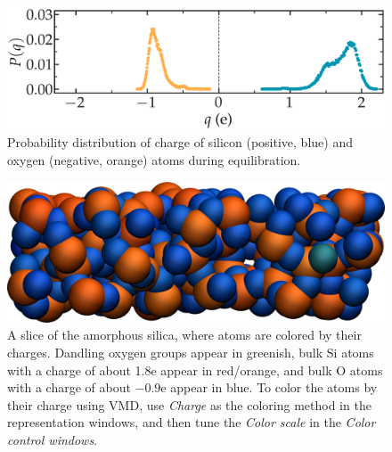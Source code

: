 \documentclass[9pt,tutorial]{livecoms}
\begin{document}
\begin{figure}
\includegraphics[width=\linewidth]{SIO-distribution}
\caption{Probability distribution of charge of silicon (positive, blue) and oxygen (negative, orange) atoms during equilibration.}
\label{fig:SIO-distribution}
\end{figure}

\begin{figure}
\includegraphics[width=\linewidth]{SIO-slice}
\caption{A slice of the amorphous silica, where atoms are colored by their charges. Dandling oxygen groups appear in greenish, bulk Si atoms with a charge of about 1.8e appear in red/orange, and bulk O atoms with a charge of about $-0.9\text{e}$ appear in blue. To color the atoms by their charge using VMD, use \textit{Charge} as the coloring method in the representation windows, and then tune the \textit{Color scale} in the \textit{Color control windows}.}
\label{fig:SIO-slice}
\end{figure}
\end{document}
